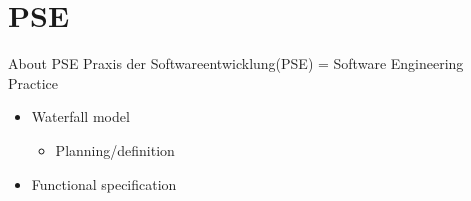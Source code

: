 \section{PSE}

\begin{frame}{About PSE}
	Praxis der Softwareentwicklung(PSE) = Software Engineering Practice
	\begin{itemize}
		\item Waterfall model
		 \begin{itemize} 
			\item Planning/definition
		\end{itemize}
		\item Functional specification
	\end{itemize}
\end{frame}
